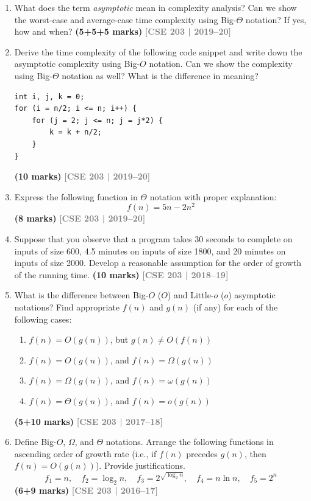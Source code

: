 \documentclass[12pt,a3paper]{article}
\newcommand{\yr}[1]{\hfill\textcolor{gray}{\small\textbf{[#1]}}}
\newcommand{\mk}[1]{\textcolor{orange!70!black}{\small\textbf{(#1 marks)}}}
\begin{document}
\begin{enumerate}
\item What does the term \textit{asymptotic} mean in complexity analysis? Can we show the worst-case and average-case time complexity using Big-$\Theta$ notation? If yes, how and when? \mk{5+5+5}
\yr{CSE 203 | 2019--20}

\item Derive the time complexity of the following code snippet and write down the asymptotic complexity using Big-$O$ notation. Can we show the complexity using Big-$\Theta$ notation as well? What is the difference in meaning?
\begin{verbatim}
int i, j, k = 0;
for (i = n/2; i <= n; i++) {
    for (j = 2; j <= n; j = j*2) {
        k = k + n/2;
    }
}
\end{verbatim}
\mk{10}
\yr{CSE 203 | 2019--20}

\item Express the following function in $\Theta$ notation with proper explanation:
\[ f(n) = 5n - 2n^2 \]
\mk{8}
\yr{CSE 203 | 2019--20}

\item Suppose that you observe that a program takes 30 seconds to complete on inputs of size 600, 4.5 minutes on inputs of size 1800, and 20 minutes on inputs of size 2000. Develop a reasonable assumption for the order of growth of the running time. \mk{10}
\yr{CSE 203 | 2018--19}

\item What is the difference between Big-$O$ ($O$) and Little-$o$ ($o$) asymptotic notations? Find appropriate $f(n)$ and $g(n)$ (if any) for each of the following cases:
\begin{enumerate}
  \item $f(n) = O(g(n))$, but $g(n) \neq O(f(n))$
  \item $f(n) = O(g(n))$, and $f(n) = \Omega(g(n))$
  \item $f(n) = \Omega(g(n))$, and $f(n) = \omega(g(n))$
  \item $f(n) = \Theta(g(n))$, and $f(n) = o(g(n))$
\end{enumerate}
\mk{5+10}
\yr{CSE 203 | 2017--18}

\item Define Big-$O$, $\Omega$, and $\Theta$ notations. Arrange the following functions in ascending order of growth rate (i.e., if $f(n)$ precedes $g(n)$, then $f(n) = O(g(n))$). Provide justifications.
\[ f_1 = n, \quad f_2 = \log_2 n, \quad f_3 = 2^{\sqrt{\log_2 n}}, \quad f_4 = n \ln n, \quad f_5 = 2^n \]
\mk{6+9}
\yr{CSE 203 | 2016--17}


\end{enumerate}
\end{document}
